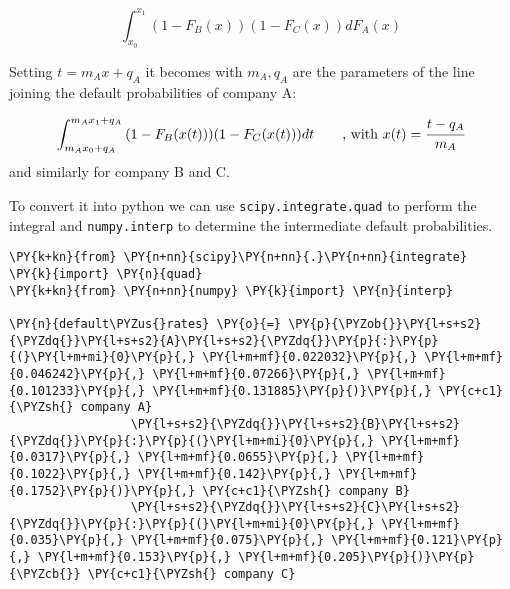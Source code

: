 \[ \int_{x_0}^{x_1}{(1-F_B(x))(1-F_C(x))dF_A(x)}\]

Setting \(t=m_A x + q_A\) it becomes with \(m_A, q_A\) are the
parameters of the line joining the default probabilities of company A:

\[ \int_{m_A x_0 + q_A}^{m_A x_1 + q_A}{(1-F_B(x(t)))(1-F_C(x(t)))dt}~~~~~~\textrm{, with}~x(t) = \cfrac{t -q_A}{m_A} \]
and similarly for company B and C.

To convert it into python we can use \texttt{scipy.integrate.quad} to
perform the integral and \texttt{numpy.interp} to determine the
intermediate default probabilities.

    \begin{tcolorbox}[breakable, size=fbox, boxrule=1pt, pad at break*=1mm,colback=cellbackground, colframe=cellborder]
\begin{Verbatim}[commandchars=\\\{\}]
\PY{k+kn}{from} \PY{n+nn}{scipy}\PY{n+nn}{.}\PY{n+nn}{integrate} \PY{k}{import} \PY{n}{quad}
\PY{k+kn}{from} \PY{n+nn}{numpy} \PY{k}{import} \PY{n}{interp}

\PY{n}{default\PYZus{}rates} \PY{o}{=} \PY{p}{\PYZob{}}\PY{l+s+s2}{\PYZdq{}}\PY{l+s+s2}{A}\PY{l+s+s2}{\PYZdq{}}\PY{p}{:}\PY{p}{(}\PY{l+m+mi}{0}\PY{p}{,} \PY{l+m+mf}{0.022032}\PY{p}{,} \PY{l+m+mf}{0.046242}\PY{p}{,} \PY{l+m+mf}{0.07266}\PY{p}{,} \PY{l+m+mf}{0.101233}\PY{p}{,} \PY{l+m+mf}{0.131885}\PY{p}{)}\PY{p}{,} \PY{c+c1}{\PYZsh{} company A}
                 \PY{l+s+s2}{\PYZdq{}}\PY{l+s+s2}{B}\PY{l+s+s2}{\PYZdq{}}\PY{p}{:}\PY{p}{(}\PY{l+m+mi}{0}\PY{p}{,} \PY{l+m+mf}{0.0317}\PY{p}{,} \PY{l+m+mf}{0.0655}\PY{p}{,} \PY{l+m+mf}{0.1022}\PY{p}{,} \PY{l+m+mf}{0.142}\PY{p}{,} \PY{l+m+mf}{0.1752}\PY{p}{)}\PY{p}{,} \PY{c+c1}{\PYZsh{} company B}
                 \PY{l+s+s2}{\PYZdq{}}\PY{l+s+s2}{C}\PY{l+s+s2}{\PYZdq{}}\PY{p}{:}\PY{p}{(}\PY{l+m+mi}{0}\PY{p}{,} \PY{l+m+mf}{0.035}\PY{p}{,} \PY{l+m+mf}{0.075}\PY{p}{,} \PY{l+m+mf}{0.121}\PY{p}{,} \PY{l+m+mf}{0.153}\PY{p}{,} \PY{l+m+mf}{0.205}\PY{p}{)}\PY{p}{\PYZcb{}} \PY{c+c1}{\PYZsh{} company C}


\end{Verbatim}
\end{tcolorbox}
